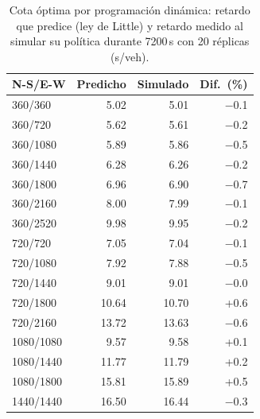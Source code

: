 \begin{table}[t]
\centering
\caption{Cota \'optima por programaci\'on din\'amica: retardo que predice (ley de Little) y retardo medido al simular su pol\'itica durante 7200\,s con 20 r\'eplicas (s/veh).}
\label{tab:smdp}
\scriptsize
\begin{tabular}{@{}lrrr@{}}
\toprule
N-S/E-W & Predicho & Simulado & Dif.\ (\%) \\
\midrule
360/360 & 5.02 & 5.01 & $-$0.1 \\
360/720 & 5.62 & 5.61 & $-$0.2 \\
360/1080 & 5.89 & 5.86 & $-$0.5 \\
360/1440 & 6.28 & 6.26 & $-$0.2 \\
360/1800 & 6.96 & 6.90 & $-$0.7 \\
360/2160 & 8.00 & 7.99 & $-$0.1 \\
360/2520 & 9.98 & 9.95 & $-$0.2 \\
720/720 & 7.05 & 7.04 & $-$0.1 \\
720/1080 & 7.92 & 7.88 & $-$0.5 \\
720/1440 & 9.01 & 9.01 & $-$0.0 \\
720/1800 & 10.64 & 10.70 & +0.6 \\
720/2160 & 13.72 & 13.63 & $-$0.6 \\
1080/1080 & 9.57 & 9.58 & +0.1 \\
1080/1440 & 11.77 & 11.79 & +0.2 \\
1080/1800 & 15.81 & 15.89 & +0.5 \\
1440/1440 & 16.50 & 16.44 & $-$0.3 \\
\bottomrule
\end{tabular}
\end{table}
